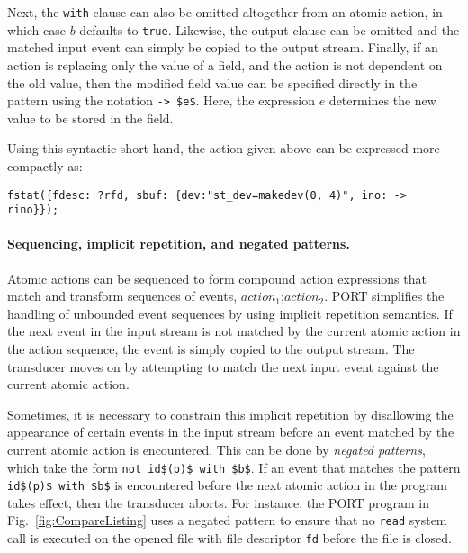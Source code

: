 Next, the \lstinline+with+ clause can also be omitted altogether from an atomic action, in which case $b$ defaults to \lstinline+true+. Likewise, the output clause can be omitted and the matched input event can simply be copied to the output stream. Finally, if an action is replacing only the value of a field, and the action is not dependent on the old value, then the modified field value can be specified directly in the pattern using the notation \lstinline+-> $e$+. Here, the expression $e$ determines the new value to be stored in the field.

Using this syntactic short-hand, the action given above can be expressed more compactly as:
\begin{lstlisting}[numbers=none,xleftmargin=0em,gobble=2]
  fstat({fdesc: ?rfd, sbuf: {dev:"st_dev=makedev(0, 4)", ino: -> rino}});
\end{lstlisting}


\paragraph*{Sequencing, implicit repetition, and negated patterns.}
Atomic actions can be sequenced to form compound action expressions that match and transform sequences of events, $\mathit{action}_1 \texttt{;} \mathit{action}_2$. PORT simplifies the handling of unbounded event sequences by using implicit repetition semantics.
If the next event in the input stream is not matched by the current atomic action in the action sequence, the event is simply copied to the output stream. The transducer moves on by attempting to match the next input event against the current atomic action.

Sometimes, it is necessary to constrain this implicit repetition by disallowing the appearance of certain events in the input stream before an event  matched by the current atomic action is encountered.  This can be done by \emph{negated patterns}, which take the form \lstinline+not id$(p)$ with $b$+. If an event that matches the pattern \lstinline+id$(p)$ with $b$+ is encountered before the next atomic action in the program takes effect, then the transducer aborts. For instance, the PORT program in Fig.~\ref{fig:CompareListing} uses a negated pattern to ensure that no \lstinline+read+ system call is executed on the opened file with file descriptor \lstinline+fd+ before the file is closed.

